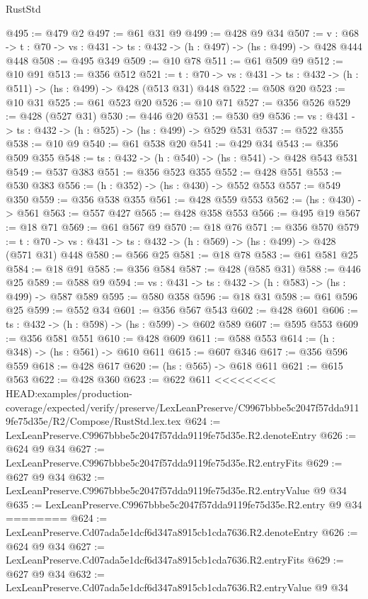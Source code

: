 \begin{lexlean}{RustStd}
\begin{coremodule}
{\begin{coremodule}
@495 := @479 @2
@497 := @61 @31 @9
@499 := @428 @9 @34
@507 := {v : @68} ->
  {t : @70} -> {vs : @431} -> {ts : @432} -> (h : @497) -> (hs : @499) -> @428 @444 @448
@508 := @495 @349
@509 := @10 @78
@511 := @61 @509 @9
@512 := @10 @91
@513 := @356 @512
@521 := {t : @70} -> {vs : @431} -> {ts : @432} -> (h : @511) -> (hs : @499) -> @428 (@513 @31) @448
@522 := @508 @20
@523 := @10 @31
@525 := @61 @523 @20
@526 := @10 @71
@527 := @356 @526
@529 := @428 (@527 @31)
@530 := @446 @20
@531 := @530 @9
@536 := {vs : @431} -> {ts : @432} -> (h : @525) -> (hs : @499) -> @529 @531
@537 := @522 @355
@538 := @10 @9
@540 := @61 @538 @20
@541 := @429 @34
@543 := @356 @509 @355
@548 := {ts : @432} -> (h : @540) -> (hs : @541) -> @428 @543 @531
@549 := @537 @383
@551 := @356 @523 @355
@552 := @428 @551
@553 := @530 @383
@556 := (h : @352) -> (hs : @430) -> @552 @553
@557 := @549 @350
@559 := @356 @538 @355
@561 := @428 @559 @553
@562 := (hs : @430) -> @561
@563 := @557 @427
@565 := @428 @358 @553
@566 := @495 @19
@567 := @18 @71
@569 := @61 @567 @9
@570 := @18 @76
@571 := @356 @570
@579 := {t : @70} -> {vs : @431} -> {ts : @432} -> (h : @569) -> (hs : @499) -> @428 (@571 @31) @448
@580 := @566 @25
@581 := @18 @78
@583 := @61 @581 @25
@584 := @18 @91
@585 := @356 @584
@587 := @428 (@585 @31)
@588 := @446 @25
@589 := @588 @9
@594 := {vs : @431} -> {ts : @432} -> (h : @583) -> (hs : @499) -> @587 @589
@595 := @580 @358
@596 := @18 @31
@598 := @61 @596 @25
@599 := @552 @34
@601 := @356 @567 @543
@602 := @428 @601
@606 := {ts : @432} -> (h : @598) -> (hs : @599) -> @602 @589
@607 := @595 @553
@609 := @356 @581 @551
@610 := @428 @609
@611 := @588 @553
@614 := (h : @348) -> (hs : @561) -> @610 @611
@615 := @607 @346
@617 := @356 @596 @559
@618 := @428 @617
@620 := (hs : @565) -> @618 @611
@621 := @615 @563
@622 := @428 @360
@623 := @622 @611
<<<<<<<< HEAD:examples/production-coverage/expected/verify/preserve/LexLeanPreserve/C9967bbbe5c2047f57dda9119fe75d35e/R2/Compose/RustStd.lex.tex
@624 := LexLeanPreserve.C9967bbbe5c2047f57dda9119fe75d35e.R2.denoteEntry
@626 := @624 @9 @34
@627 := LexLeanPreserve.C9967bbbe5c2047f57dda9119fe75d35e.R2.entryFits
@629 := @627 @9 @34
@632 := LexLeanPreserve.C9967bbbe5c2047f57dda9119fe75d35e.R2.entryValue @9 @34
@635 := LexLeanPreserve.C9967bbbe5c2047f57dda9119fe75d35e.R2.entry @9 @34
========
@624 := LexLeanPreserve.Cd07ada5e1dcf6d347a8915cb1cda7636.R2.denoteEntry
@626 := @624 @9 @34
@627 := LexLeanPreserve.Cd07ada5e1dcf6d347a8915cb1cda7636.R2.entryFits
@629 := @627 @9 @34
@632 := LexLeanPreserve.Cd07ada5e1dcf6d347a8915cb1cda7636.R2.entryValue @9 @34

\end{coremodule}}
\end{coremodule}
\end{lexlean}
